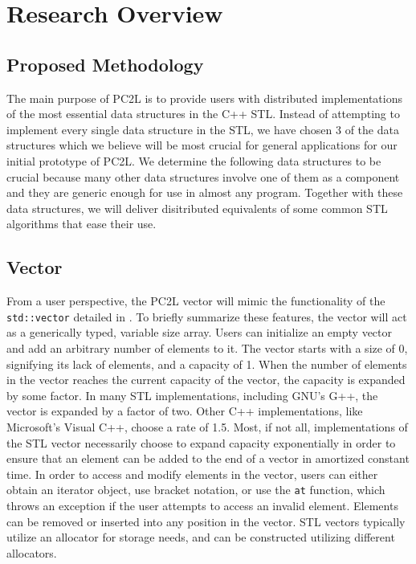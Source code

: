 \chapter{Research Overview}
\section{Proposed Methodology}
The main purpose of PC2L is to provide users with distributed implementations of the most essential data structures in the C++ STL. Instead of attempting to implement every single data structure in the STL, we have chosen 3 of the data structures which we believe will be most crucial for general applications for our initial prototype of PC2L. We determine the following data structures to be crucial because many other data structures involve one of them as a component and they are generic enough for use in almost any program. Together with these data structures, we will deliver disitributed equivalents of some common STL algorithms that ease their use.    

\section{Vector}
From a user perspective, the PC2L vector will mimic the functionality of the \texttt{std::vector} detailed in \cite{stl_guide} \cite{cpp_ref_vector}. To briefly summarize these features, the vector will act as a generically typed, variable size array. Users can initialize an empty vector and add an arbitrary number of elements to it. The vector starts with a size of 0, signifying its lack of elements, and a capacity of 1. When the number of elements in the vector reaches the current capacity of the vector, the capacity is expanded by some factor. In many STL implementations, including GNU's G++, the vector is expanded by a factor of two. Other C++ implementations, like Microsoft's Visual C++, choose a rate of 1.5. Most, if not all, implementations of the STL vector necessarily choose to expand capacity exponentially in order to ensure that an element can be added to the end of a vector in amortized constant time. In order to access and modify elements in the vector, users can either obtain an iterator object, use bracket notation, or use the \texttt{at} function, which throws an exception if the user attempts to access an invalid element. Elements can be removed or inserted into any position in the vector. STL vectors typically utilize an allocator for storage needs, and can be constructed utilizing different allocators. 

